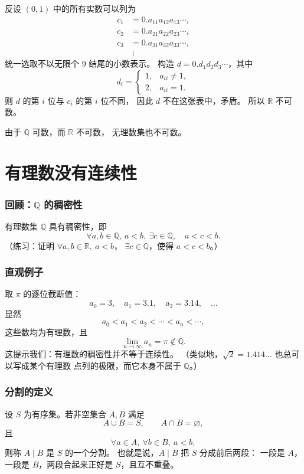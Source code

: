 \documentclass[UTF8,11pt]{ctexart}
\theoremstyle{cnthm}
\begin{document}
反设 $(0,1)$ 中的所有实数可以列为
\[
\begin{aligned}
c_1&=0.a_{11}a_{12}a_{13}\cdots,\\
c_2&=0.a_{21}a_{22}a_{23}\cdots,\\
c_3&=0.a_{31}a_{32}a_{33}\cdots,\\
&\ \vdots
\end{aligned}
\]
统一选取不以无限个 $9$ 结尾的小数表示。
构造 $d=0.d_1d_2d_3\cdots$，其中
\[
d_i=
\begin{cases}
1,&a_{ii}\ne1,\\
2,&a_{ii}=1.
\end{cases}
\]
则 $d$ 的第 $i$ 位与 $c_i$ 的第 $i$ 位不同，
因此 $d$ 不在这张表中，矛盾。
所以 $\mathbb R$ 不可数。

由于 $\mathbb Q$ 可数，而 $\mathbb R$ 不可数，
无理数集也不可数。

\section{有理数没有连续性}

\subsubsection*{回顾：$\mathbb Q$ 的稠密性}

有理数集 $\mathbb Q$ 具有稠密性，即
\[
\forall a,b\in\mathbb Q,\ a<b,\ \exists c\in\mathbb Q,\quad a<c<b .
\]
（练习：证明 $\forall a,b\in\mathbb R,\ a<b$，
$\exists c\in\mathbb Q$，使得 $a<c<b$。）

\subsubsection*{直观例子}

取 $\pi$ 的逐位截断值：
\[
a_0=3,\quad a_1=3.1,\quad
a_2=3.14,\quad\ldots
\]
显然
\[
a_0<a_1<a_2<\cdots<a_n<\cdots,
\]
这些数均为有理数，且
\[
\lim_{n\to\infty}a_n=\pi\notin\mathbb Q.
\]
这提示我们：有理数的稠密性并不等于连续性。
（类似地，$\sqrt2=1.414\ldots$ 也总可以写成某个有理数
点列的极限，而它本身不属于 $\mathbb Q$。）

\subsubsection*{分割的定义}

设 $S$ 为有序集。若非空集合 $A,B$ 满足
\[
A\cup B=S,\qquad A\cap B=\varnothing,
\]
且
\[
\forall a\in A,\ \forall b\in B,\ a<b,
\]
则称 $A\mid B$ 是 $S$ 的一个分割。
也就是说，$A\mid B$ 把 $S$ 分成前后两段：
一段是 $A$，一段是 $B$，两段合起来正好是 $S$，且互不重叠。
\end{document}
